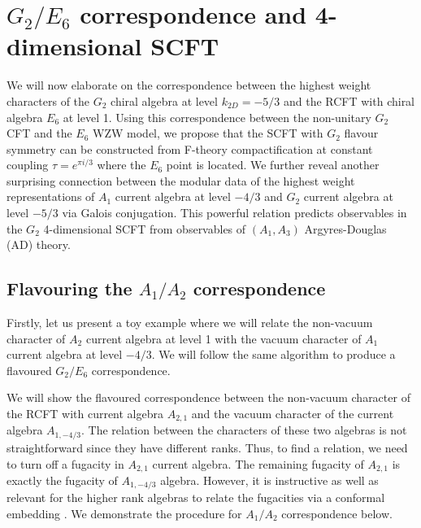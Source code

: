 \documentclass[a4paper,12pt]{article}
\begin{document}
\section{\ensuremath{G_2/E_6} correspondence and 4-dimensional SCFT}\label{g2-e6-section}
We will now elaborate on the correspondence between the highest weight characters of the $G_{2}$ chiral algebra at level $k_{2D}=-5/3$ and the RCFT with chiral algebra $E_6$ at level 1. Using this correspondence between the non-unitary $G_2$ CFT and the $E_6$ WZW model, we propose that the SCFT with $G_2$ flavour symmetry can be constructed from F-theory compactification at constant coupling $\tau=e^{\pi i/3}$ where the $E_6$ point is located\cite{Sen:1996vd, Dasgupta:1996ij}. We further reveal another surprising connection between the modular data of the highest weight representations of $A_1$ current algebra at level $-4/3$ and $G_2$ current algebra at level $-5/3$ via Galois conjugation. This powerful relation predicts observables in the $G_2$ 4-dimensional SCFT from observables of $(A_1,A_3)$ Argyres-Douglas (AD) theory.

\subsection{Flavouring the \ensuremath{A_1/A_2} correspondence}\label{flavouring_a1_a2}

Firstly, let us present a toy example where we will relate the non-vacuum character of $A_2$ current algebra at level 1 with the vacuum character of $A_{1}$ current algebra at level $-4/3$. We will follow the same algorithm to produce a flavoured $G_2/E_6$ correspondence.

We will show the flavoured correspondence between the non-vacuum character of the RCFT with current algebra $A_{2,1}$ and the vacuum character of the current algebra $A_{1,-4/3}$. The relation between the characters of these two algebras is not straightforward since they have different ranks. Thus, to find a relation, we need to turn off a fugacity in $A_{2,1}$ current algebra. The remaining fugacity of $A_{2,1}$ is exactly the fugacity of $A_{1,-4/3}$ algebra. However, it is instructive as well as relevant for the higher rank algebras to relate the fugacities via a conformal embedding \cite{Buican:2019huq}. We demonstrate the procedure for $A_1/A_2$ correspondence below. 
\end{document}
